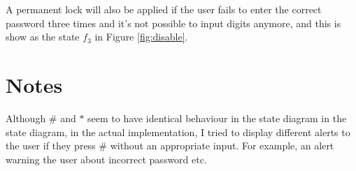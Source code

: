 \documentclass[12pt]{article}
\begin{document}
A permanent lock will also be applied if the user fails to enter the correct password three times and it's not possible to input digits anymore, and this is show as the state $f_3$ in Figure \ref{fig:disable}.

\section{Notes}

Although $\#$ and $*$ seem to have identical behaviour in the state diagram in the state diagram, in the actual implementation, I tried to display different alerts to the user if they press $\#$ without an appropriate input. For example, an alert warning the user about incorrect password etc.
\end{document}

